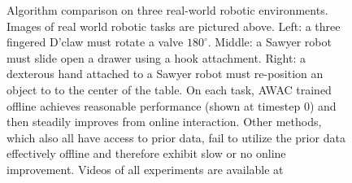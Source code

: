 \begin{figure}[t]
    \caption{
    Algorithm comparison on three real-world robotic environments. Images of real world robotic tasks are pictured above. Left: a three fingered D'claw must rotate a valve $180^\circ$. Middle: a Sawyer robot must slide open a drawer using a hook attachment. Right: a dexterous hand attached to a Sawyer robot must re-position an object to to the center of the table. On each task, AWAC trained offline achieves reasonable performance (shown at timestep 0) and then steadily improves from online interaction. Other methods, which also all have access to prior data, fail to utilize the prior data effectively offline and therefore exhibit slow or no online improvement. Videos of all experiments are available at \projectpage
    \vspace{-0.5cm}
    }
    \label{fig:robot-learning-curves}
\end{figure}
